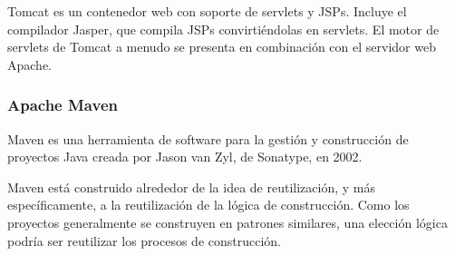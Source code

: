 Tomcat es un contenedor web con soporte de servlets y JSPs. Incluye el compilador Jasper, que compila JSPs convirtiéndolas en servlets. El motor de servlets de Tomcat a menudo se presenta en combinación con el servidor web Apache.

\subsubsection{Apache Maven}

Maven es una herramienta de software para la gestión y construcción de proyectos Java creada por Jason van Zyl, de Sonatype, en 2002. 

Maven está construido alrededor de la idea de reutilización, y más específicamente, a la reutilización de la lógica de construcción. Como los proyectos generalmente se construyen en patrones similares, una elección lógica podría ser reutilizar los procesos de construcción.